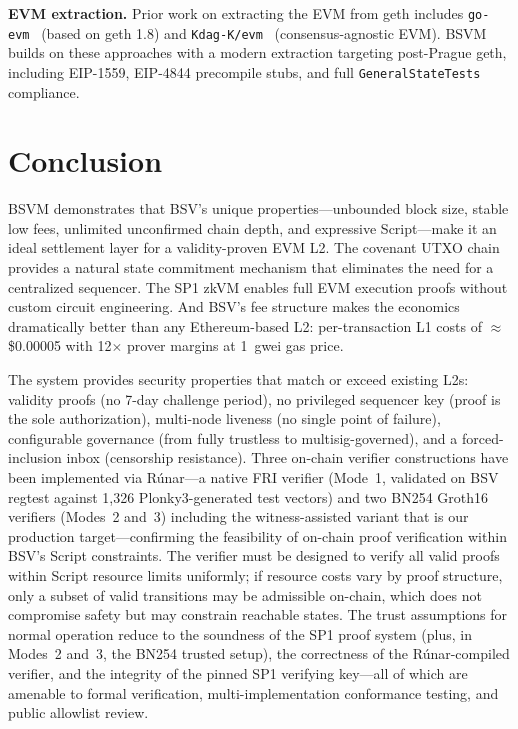 \documentclass[11pt,twocolumn]{article}
\begin{document}
\textbf{EVM extraction.} Prior work on extracting the EVM from geth includes \texttt{go-evm}~\cite{go_evm} (based on geth 1.8) and \texttt{Kdag-K/evm}~\cite{kdag_evm} (consensus-agnostic EVM). BSVM builds on these approaches with a modern extraction targeting post-Prague geth, including EIP-1559, EIP-4844 precompile stubs, and full \texttt{GeneralStateTests} compliance.

\section{Conclusion}
\label{sec:conclusion}

BSVM demonstrates that BSV's unique properties---unbounded block size, stable low fees, unlimited unconfirmed chain depth, and expressive Script---make it an ideal settlement layer for a validity-proven EVM L2. The covenant UTXO chain provides a natural state commitment mechanism that eliminates the need for a centralized sequencer. The SP1 zkVM enables full EVM execution proofs without custom circuit engineering. And BSV's fee structure makes the economics dramatically better than any Ethereum-based L2: per-transaction L1 costs of $\approx$\$0.00005 with 12$\times$ prover margins at 1~gwei gas price.

The system provides security properties that match or exceed existing L2s: validity proofs (no 7-day challenge period), no privileged sequencer key (proof is the sole authorization), multi-node liveness (no single point of failure), configurable governance (from fully trustless to multisig-governed), and a forced-inclusion inbox (censorship resistance). Three on-chain verifier constructions have been implemented via R\'{u}nar---a native FRI verifier (Mode~1, validated on BSV regtest against 1,326 Plonky3-generated test vectors) and two BN254 Groth16 verifiers (Modes~2 and~3) including the witness-assisted variant that is our production target---confirming the feasibility of on-chain proof verification within BSV's Script constraints. The verifier must be designed to verify all valid proofs within Script resource limits uniformly; if resource costs vary by proof structure, only a subset of valid transitions may be admissible on-chain, which does not compromise safety but may constrain reachable states. The trust assumptions for normal operation reduce to the soundness of the SP1 proof system (plus, in Modes~2 and~3, the BN254 trusted setup), the correctness of the R\'{u}nar-compiled verifier, and the integrity of the pinned SP1 verifying key---all of which are amenable to formal verification, multi-implementation conformance testing, and public allowlist review.
\end{document}
